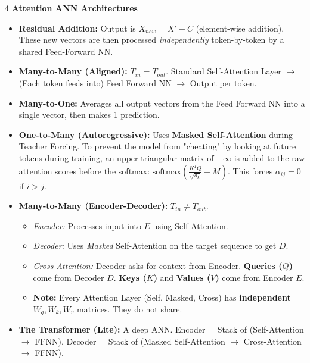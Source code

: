 \documentclass[8pt,landscape,a4paper]{extarticle}
\begin{document}
\begin{multicols*}{4}
\vspace{1mm}
\noindent\textbf{Attention ANN Architectures}
\begin{itemize}[leftmargin=*, nosep]
   \item \textbf{Residual Addition:} Output is $X_{new} = X' + C$ (element-wise addition). These new vectors are then processed \textit{independently} token-by-token by a shared Feed-Forward NN.
    \item \textbf{Many-to-Many (Aligned):} $T_{in} = T_{out}$. Standard Self-Attention Layer $\rightarrow$ (Each token feeds into) Feed Forward NN $\rightarrow$ Output per token.
    \item \textbf{Many-to-One:} Averages all output vectors from the Feed Forward NN into a single vector, then makes 1 prediction.
    \item \textbf{One-to-Many (Autoregressive):} Uses \textbf{Masked Self-Attention} during Teacher Forcing. To prevent the model from "cheating" by looking at future tokens during training, an upper-triangular matrix of $-\infty$ is added to the raw attention scores before the softmax: $\text{softmax}( \frac{K^T Q}{\sqrt{d_k}} + M)$. This forces $\alpha_{ij} = 0$ if $i > j$.
    \item \textbf{Many-to-Many (Encoder-Decoder):} $T_{in} \neq T_{out}$. 
    \begin{itemize}[leftmargin=*, nosep]
        \item \textit{Encoder:} Processes input into $E$ using Self-Attention.
        \item \textit{Decoder:} Uses \textit{Masked} Self-Attention on the target sequence to get $D$.
        \item \textit{Cross-Attention:} Decoder asks for context from Encoder. \textbf{Queries ($Q$)} come from Decoder $D$. \textbf{Keys ($K$)} and \textbf{Values ($V$)} come from Encoder $E$.
        \item \textbf{Note:} Every Attention Layer (Self, Masked, Cross) has \textbf{independent} $W_q, W_k, W_v$ matrices. They do not share.
    \end{itemize}
    \item \textbf{The Transformer (Lite):} A deep ANN. Encoder = Stack of (Self-Attention $\rightarrow$ FFNN). Decoder = Stack of (Masked Self-Attention $\rightarrow$ Cross-Attention $\rightarrow$ FFNN).
\end{itemize}


\end{multicols*}
\end{document}
